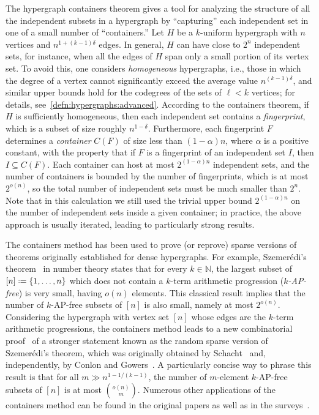 \documentclass[12pt,reqno]{amsart}
\theoremstyle{plain}
\theoremstyle{definition}
\theoremstyle{remark}
\newcommand{\0}{\mathbb{\emptyset}}
\newcommand{\N}{\mathbb{N}}
\newcommand{\set}[1]{\left\{ #1 \right\}}
\newcommand*{\defeq}{\mathrel{\vcenter{\baselineskip0.5ex \lineskiplimit0pt \hbox{\scriptsize.}\hbox{\scriptsize.}}}=}
\newcommand{\de}{\delta}
\newcommand{\Szemeredi}{Szemer\'{e}di\xspace}
\begin{document}
The hypergraph containers theorem gives a tool for analyzing the structure of all the independent subsets in a hypergraph by ``capturing'' each independent set in one of a small number of ``containers.'' Let $H$ be a $k$-uniform hypergraph with $n$ vertices and $n^{1 + (k-1)\delta}$ edges. In general, $H$ can have close to $2^n$ independent sets, for instance, when all the edges of $H$ span only a small portion of its vertex set. To avoid this, one considers \emph{homogeneous} hypergraphs, i.e., those in which the degree of a vertex cannot significantly exceed the average value $n^{(k-1)\delta}$, and similar upper bounds hold for the codegrees of the sets of $\ell < k$ vertices; for details, see~\cref{defn:hypergraphs:advanced}. According to the containers theorem, if $H$ is sufficiently homogeneous, then each independent set contains a \emph{fingerprint}, which is a subset of size roughly $n^{1 - \de}$. Furthermore, each fingerprint $F$ determines a \emph{container} $C(F)$ of size less than $(1-\alpha)n$, where $\alpha$ is a positive constant, with the property that if $F$ is a fingerprint of an independent set $I$, then $I \subseteq C(F)$. Each container can host at most $2^{(1-\alpha)n}$ independent sets, and the number of containers is bounded by the number of fingerprints, which is at most $2^{o(n)}$, so the total number of independent sets must be much smaller than $2^n$. Note that in this calculation we still used the trivial upper bound $2^{(1-\alpha)n}$ on the number of independent sets inside a given container; in practice, the above approach is usually iterated, leading to particularly strong results.

The containers method has been used to prove (or reprove) sparse versions of theorems originally established for dense hypergraphs. For example, {\Szemeredi's theorem}~\cite{sz} in number theory states that for every $k \in \N$, the largest subset of $[n] \defeq \set{1, \hdots, n}$ which does not contain a $k$-term arithmetic progression (\emph{$k$-AP-free}) is very small, having $o(n)$ elements. This classical result implies that the number of $k$-AP-free subsets of $[n]$ is also small, namely at most $2^{o(n)}$. Considering the hypergraph with vertex set $[n]$ whose edges are the $k$-term arithmetic progressions, the containers method leads to a new combinatorial proof~\cite{bms, st} of a stronger statement known as the {random sparse  version of \Szemeredi's theorem}, which was originally obtained by Schacht~\cite{s} and, independently, by Conlon and Gowers~\cite{cg}. A particularly concise way to phrase this result \cite[Theorem~1.1]{bms} is that for all $m \gg n^{1-1/(k-1)}$, the number of $m$-element $k$-AP-free subsets of $[n]$ is at most ${o(n) \choose m}$. Numerous other applications of the containers method can be found in the original papers \cite{bms, st} as well as in the surveys~\cite{BMS_survey, conlon:icm, RodlSchacht}.
\end{document}

